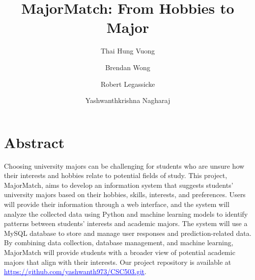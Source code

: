 \documentclass[sigconf]{acmart}
\begin{document}

\title{MajorMatch: From Hobbies to Major}


\author{Thai Hung Vuong}

\author{Brendan Wong}

\author{Robert Legassicke}

\author{Yashwanthkrishna Nagharaj}


\maketitle


\section{Abstract}
Choosing university majors can be challenging for students who are unsure how their interests and hobbies relate to potential fields of study. This project, MajorMatch, aims to develop an information system that suggests students' university majors based on their hobbies, skills, interests, and preferences. Users will provide their information through a web interface, and the system will analyze the collected data using Python and machine learning models to identify patterns between students' interests and academic majors. The system will use a MySQL database to store and manage user responses and prediction-related data. By combining data collection, database management, and machine learning, MajorMatch will provide students with a broader view of potential academic majors that align with their interests. Our project repository is available at
\href{https://github.com/yashwanth973/CSC503.git}
{\textcolor{blue}{\underline{https://github.com/yashwanth973/CSC503.git}}}.
\end{document}
